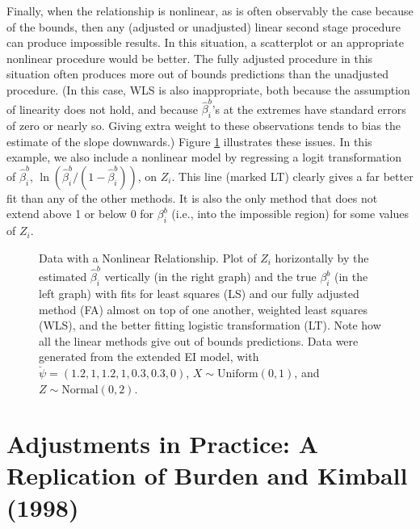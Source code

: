 \documentclass[11pt,titlepage]{article}
\begin{document}
Finally, when the relationship is nonlinear, as is often observably
the case because of the bounds, then any (adjusted or unadjusted)
linear second stage procedure can produce impossible results.  In this
situation, a scatterplot or an appropriate nonlinear procedure would
be better.  The fully adjusted procedure in this situation often
produces more out of bounds predictions than the unadjusted procedure.
(In this case, WLS is also inappropriate, both because the assumption
of linearity does not hold, and because $\hat\beta_i^b$'s at the
extremes have standard errors of zero or nearly so.  Giving extra
weight to these observations tends to bias the estimate of the slope
downwards.)  Figure \ref{f:nonlinear} illustrates these issues.  In
this example, we also include a nonlinear model by regressing a logit
transformation of $\hat\beta_i^b$,
$\ln(\hat\beta_i^b/(1-\hat\beta_i^b))$, on $Z_i$.  This line (marked
LT) clearly gives a far better fit than any of the other methods.  It
is also the only method that does not extend above 1 or below 0 for
$\beta_i^b$ (i.e., into the impossible region) for some values of
$Z_i$.
\begin{figure}[t]
  \begin{center}
    \caption{Data with a Nonlinear Relationship.  Plot of $Z_i$ 
      horizontally by the estimated $\hat\beta_i^b$ vertically (in the
      right graph) and the true $\beta_i^b$ (in the left graph) with
      fits for least squares (LS) and our fully adjusted method (FA)
      almost on top of one another, weighted least squares (WLS), and
      the better fitting logistic transformation (LT).  Note how all
      the linear methods give out of bounds predictions.  Data were
      generated from the extended EI model, with
      $\breve\psi=(1.2,1,1.2,1,0.3,0.3,0)$, $X \sim \textrm{Uniform}(0,1)$, and
      $Z \sim \textrm{Normal}(0,2)$.}
    \label{f:nonlinear}
  \end{center}
\end{figure}

\section{Adjustments in Practice: A Replication of Burden and Kimball (1998)}
\end{document}

